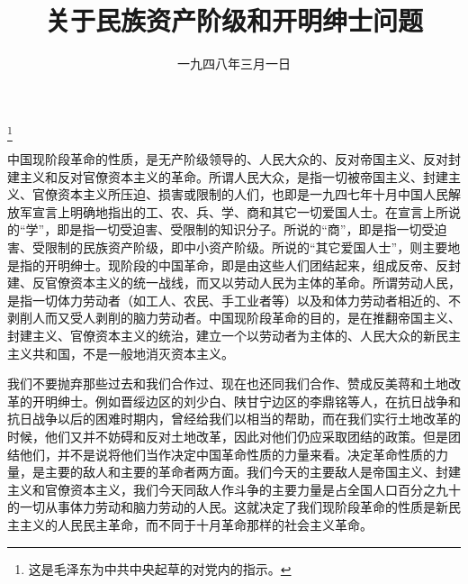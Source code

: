 
\title{关于民族资产阶级和开明绅士问题}
\date{一九四八年三月一日}
\thanks{这是毛泽东为中共中央起草的对党内的指示。}
\maketitle


中国现阶段革命的性质，是无产阶级领导的、人民大众的、反对帝国主义、反对封建主义和反对官僚资本主义的革命。所谓人民大众，是指一切被帝国主义、封建主义、官僚资本主义所压迫、损害或限制的人们，也即是一九四七年十月中国人民解放军宣言上明确地指出的工、农、兵、学、商和其它一切爱国人士。在宣言上所说的“学”，即是指一切受迫害、受限制的知识分子。所说的“商”，即是指一切受迫害、受限制的民族资产阶级，即中小资产阶级。所说的“其它爱国人士”，则主要地是指的开明绅士。现阶段的中国革命，即是由这些人们团结起来，组成反帝、反封建、反官僚资本主义的统一战线，而又以劳动人民为主体的革命。所谓劳动人民，是指一切体力劳动者（如工人、农民、手工业者等）以及和体力劳动者相近的、不剥削人而又受人剥削的脑力劳动者。中国现阶段革命的目的，是在推翻帝国主义、封建主义、官僚资本主义的统治，建立一个以劳动者为主体的、人民大众的新民主主义共和国，不是一般地消灭资本主义。

我们不要抛弃那些过去和我们合作过、现在也还同我们合作、赞成反美蒋和土地改革的开明绅士。例如晋绥边区的刘少白、陕甘宁边区的李鼎铭等人，在抗日战争和抗日战争以后的困难时期内，曾经给我们以相当的帮助，而在我们实行土地改革的时候，他们又并不妨碍和反对土地改革，因此对他们仍应采取团结的政策。但是团结他们，并不是说将他们当作决定中国革命性质的力量来看。决定革命性质的力量，是主要的敌人和主要的革命者两方面。我们今天的主要敌人是帝国主义、封建主义和官僚资本主义，我们今天同敌人作斗争的主要力量是占全国人口百分之九十的一切从事体力劳动和脑力劳动的人民。这就决定了我们现阶段革命的性质是新民主主义的人民民主革命，而不同于十月革命那样的社会主义革命。

